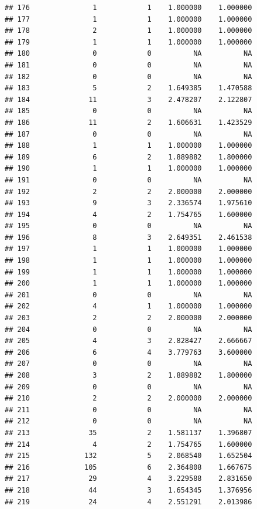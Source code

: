 \documentclass[
]{article}
\begin{document}
\begin{verbatim}
## 176               1            1    1.000000    1.000000
## 177               1            1    1.000000    1.000000
## 178               2            1    1.000000    1.000000
## 179               1            1    1.000000    1.000000
## 180               0            0          NA          NA
## 181               0            0          NA          NA
## 182               0            0          NA          NA
## 183               5            2    1.649385    1.470588
## 184              11            3    2.478207    2.122807
## 185               0            0          NA          NA
## 186              11            2    1.606631    1.423529
## 187               0            0          NA          NA
## 188               1            1    1.000000    1.000000
## 189               6            2    1.889882    1.800000
## 190               1            1    1.000000    1.000000
## 191               0            0          NA          NA
## 192               2            2    2.000000    2.000000
## 193               9            3    2.336574    1.975610
## 194               4            2    1.754765    1.600000
## 195               0            0          NA          NA
## 196               8            3    2.649351    2.461538
## 197               1            1    1.000000    1.000000
## 198               1            1    1.000000    1.000000
## 199               1            1    1.000000    1.000000
## 200               1            1    1.000000    1.000000
## 201               0            0          NA          NA
## 202               4            1    1.000000    1.000000
## 203               2            2    2.000000    2.000000
## 204               0            0          NA          NA
## 205               4            3    2.828427    2.666667
## 206               6            4    3.779763    3.600000
## 207               0            0          NA          NA
## 208               3            2    1.889882    1.800000
## 209               0            0          NA          NA
## 210               2            2    2.000000    2.000000
## 211               0            0          NA          NA
## 212               0            0          NA          NA
## 213              35            2    1.581137    1.396807
## 214               4            2    1.754765    1.600000
## 215             132            5    2.068540    1.652504
## 216             105            6    2.364808    1.667675
## 217              29            4    3.229588    2.831650
## 218              44            3    1.654345    1.376956
## 219              24            4    2.551291    2.013986

\end{verbatim}
\end{document}
